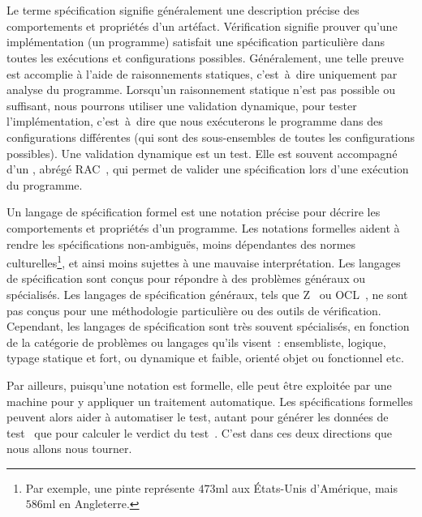 \section{}

Le terme {\strong spécification} signifie généralement une description précise
des comportements et propriétés d'un artéfact. {\strong Vérification} signifie
prouver qu'une implémentation (un programme) satisfait une spécification
particulière dans toutes les exécutions et configurations possibles.
Généralement, une telle preuve est accomplie à l'aide de raisonnements
statiques, c'est~à~dire uniquement par analyse du programme. Lorsqu'un
raisonnement statique n'est pas possible ou suffisant, nous pourrons utiliser
une {\strong validation} dynamique, pour tester l'implémentation, c'est~à~dire
que nous exécuterons le programme dans des configurations différentes (qui sont
des sous-ensembles de toutes les configurations possibles). Une validation
dynamique est un test. Elle est souvent accompagné d'un , abrégé RAC~, qui permet de valider une
spécification lors d'une exécution du programme.

Un {\strong langage de spécification} formel est une notation précise pour
décrire les comportements et propriétés d'un programme. Les {\strong notations
formelles} aident à rendre les spécifications non-ambiguës, moins dépendantes
des normes culturelles\footnote{Par exemple, une pinte représente $473$ml aux
États-Unis d'Amérique, mais $586$ml en Angleterre.}, et ainsi moins sujettes à
une mauvaise interprétation. Les langages de spécification sont conçus pour
répondre à des problèmes généraux ou spécialisés. Les langages de spécification
généraux, tels que Z~ ou OCL~, ne sont pas
conçus pour une méthodologie particulière ou des outils de vérification.
Cependant, les langages de spécification sont très souvent spécialisés, en
fonction de la catégorie de problèmes ou langages qu'ils visent~: ensembliste,
logique, typage statique et fort, ou dynamique et faible, orienté objet ou
fonctionnel etc.

Par ailleurs, puisqu'une notation est formelle, elle peut être exploitée par une
machine pour y appliquer un traitement automatique. Les spécifications formelles
peuvent alors aider à {\strong automatiser le test}, autant pour générer les
données de test~ que pour
calculer le verdict du test~. C'est dans ces deux directions que
nous allons nous tourner.

